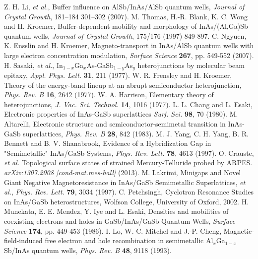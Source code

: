 \documentclass[titlepage,a4paper]{book}
\begin{document}
\begin{thebibliography}{99}
Z. H. Li, \textit{et al.}, Buffer influence on AlSb/InAs/AlSb quantum wells, \textit{Journal of Crystal Growth}, 181–184 301–302 (2007).
M. Thomas, H.-R. Blank, K. C. Wong and H. Kroemer, Buffer-dependent mobility and morphology of InAs/(Al,Ga)Sb quantum wells, \textit{Journal of Crystal Growth}, 175/176 (1997) 849-897.
C. Ngyuen, K. Ensslin and H. Kroemer, Magneto-transport in InAs/AlSb quantum wells with large electron concentration modulation, \textit{Surface Science} \textbf{267}, pp. 549-552 (2007).
H. Sasaki, \textit{et al.}, In$_{1-x}$Ga$_x$As-GaSb$_{1-y}$As$_y$ heterojunctions by molecular beam epitaxy, \textit{Appl. Phys. Lett.} \textbf{31}, 211 (1977).
W. R. Frensley and H. Kroemer, Theory of the energy-band lineup at an abrupt semiconductor heterojunction, \textit{Phys. Rev. B} \textbf{16}, 2642 (1977).
W. A. Harrison, Elementary theory of heterojunctions, \textit{J. Vac. Sci. Technol.} \textbf{14}, 1016 (1977).
L. L. Chang and L. Esaki, Electronic properties of InAs-GaSb superlattices \textit{Surf. Sci.} \textbf{98}, 70 (1980).
M. Altarelli, Electronic structure and semiconductor-semimetal transition in InAs-GaSb superlattices, \textit{Phys. Rev. B} \textbf{28}, 842 (1983).
M. J. Yang, C. H. Yang, B. R. Bennett and B. V. Shanabrook, Evidence of a Hybridization Gap in "Semimetallic" InAs/GaSb Systems, \textit{Phys. Rev. Lett.} \textbf{78}, 4613 (1997).
O. Crauste, \textit{et al.} Topological surface states of strained Mercury-Telluride probed by ARPES. \textit{arXiv:1307.2008 [cond-mat.mes-hall]} (2013).
M. Lakrimi, Minigaps and Novel Giant Negative Magnetoresistance in InAs/GaSb Semimetallic Superlattices, \textit{et al.}, \textit{Phys. Rev. Lett.} \textbf{79}, 3034 (1997).
C. Petchsingh, Cyclotron Resonance Studies on InAs/GaSb heterostructures, Wolfson College, University of Oxford, 2002.
H. Munekata, E. E. Mendez, Y. Iye and L. Esaki, Densities and mobilities of coexisting electrons and holes in GaSb/InAs/GaSb Quantum Wells, \textit{Surface Science} \textbf{174}, pp. 449-453 (1986).
I. Lo, W. C. Mitchel and J.-P. Cheng, Magnetic-field-induced free electron and hole recombination in semimetallic Al$_x$Ga$_{1-x}$Sb/InAs quantum wells, \textit{Phys. Rev. B} \textbf{48}, 9118 (1993).

\end{thebibliography}
\end{document}
